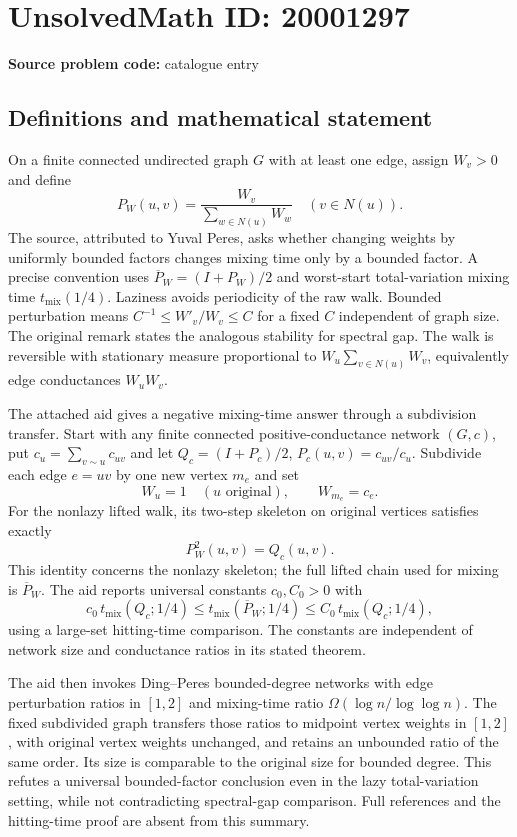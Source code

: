 \documentclass[11pt]{article}
\begin{document}
\section*{UnsolvedMath ID: 20001297}
\textbf{Source problem code:} catalogue entry
\subsection{Definitions and mathematical statement}
On a finite connected undirected graph $G$ with at least one edge, assign $W_v>0$ and define
\[
P_W(u,v)=\frac{W_v}{\sum_{w\in N(u)}W_w}\quad(v\in N(u)).
\]
The source, attributed to Yuval Peres, asks whether changing weights by uniformly bounded factors changes mixing time only by a bounded factor. A precise convention uses $\overline P_W=(I+P_W)/2$ and worst-start total-variation mixing time $t_{\mathrm{mix}}(1/4)$. Laziness avoids periodicity of the raw walk. Bounded perturbation means $C^{-1}\le W'_v/W_v\le C$ for a fixed $C$ independent of graph size. The original remark states the analogous stability for spectral gap. The walk is reversible with stationary measure proportional to $W_u\sum_{v\in N(u)}W_v$, equivalently edge conductances $W_uW_v$.

The attached aid gives a negative mixing-time answer through a subdivision transfer. Start with any finite connected positive-conductance network $(G,c)$, put $c_u=\sum_{v\sim u}c_{uv}$ and let $Q_c=(I+P_c)/2$, $P_c(u,v)=c_{uv}/c_u$. Subdivide each edge $e=uv$ by one new vertex $m_e$ and set
\[
W_u=1\quad(u\text{ original}),\qquad W_{m_e}=c_e.
\]
For the nonlazy lifted walk, its two-step skeleton on original vertices satisfies exactly
\[
P_W^2(u,v)=Q_c(u,v).
\]
This identity concerns the nonlazy skeleton; the full lifted chain used for mixing is $\overline P_W$. The aid reports universal constants $c_0,C_0>0$ with
\[
c_0\,t_{\mathrm{mix}}(Q_c;1/4)\le t_{\mathrm{mix}}(\overline P_W;1/4)
\le C_0\,t_{\mathrm{mix}}(Q_c;1/4),
\]
using a large-set hitting-time comparison. The constants are independent of network size and conductance ratios in its stated theorem.

The aid then invokes Ding--Peres bounded-degree networks with edge perturbation ratios in $[1,2]$ and mixing-time ratio $\Omega(\log n/\log\log n)$. The fixed subdivided graph transfers those ratios to midpoint vertex weights in $[1,2]$, with original vertex weights unchanged, and retains an unbounded ratio of the same order. Its size is comparable to the original size for bounded degree. This refutes a universal bounded-factor conclusion even in the lazy total-variation setting, while not contradicting spectral-gap comparison. Full references and the hitting-time proof are absent from this summary.
\end{document}
